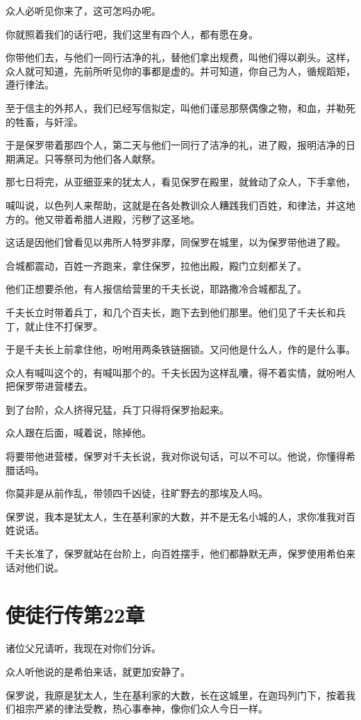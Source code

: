 \documentclass[12pt,oneside]{book}
\begin{document}
众人必听见你来了，这可怎吗办呢。

你就照着我们的话行吧，我们这里有四个人，都有愿在身。

你带他们去，与他们一同行洁净的礼，替他们拿出规费，叫他们得以剃头。这样，众人就可知道，先前所听见你的事都是虚的。并可知道，你自己为人，循规蹈矩，遵行律法。

至于信主的外邦人，我们已经写信拟定，叫他们谨忌那祭偶像之物，和血，并勒死的牲畜，与奸淫。

于是保罗带着那四个人，第二天与他们一同行了洁净的礼，进了殿，报明洁净的日期满足。只等祭司为他们各人献祭。

那七日将完，从亚细亚来的犹太人，看见保罗在殿里，就耸动了众人，下手拿他，

喊叫说，以色列人来帮助，这就是在各处教训众人糟践我们百姓，和律法，并这地方的。他又带着希腊人进殿，污秽了这圣地。

这话是因他们曾看见以弗所人特罗非摩，同保罗在城里，以为保罗带他进了殿。

合城都震动，百姓一齐跑来，拿住保罗，拉他出殿，殿门立刻都关了。

他们正想要杀他，有人报信给营里的千夫长说，耶路撒冷合城都乱了。

千夫长立时带着兵丁，和几个百夫长，跑下去到他们那里。他们见了千夫长和兵丁，就止住不打保罗。

于是千夫长上前拿住他，吩咐用两条铁链捆锁。又问他是什么人，作的是什么事。

众人有喊叫这个的，有喊叫那个的。千夫长因为这样乱囔，得不着实情，就吩咐人把保罗带进营楼去。

到了台阶，众人挤得兄猛，兵丁只得将保罗抬起来。

众人跟在后面，喊着说，除掉他。

将要带他进营楼，保罗对千夫长说，我对你说句话，可以不可以。他说，你懂得希腊话吗。

你莫非是从前作乱，带领四千凶徒，往旷野去的那埃及人吗。

保罗说，我本是犹太人，生在基利家的大数，并不是无名小城的人，求你准我对百姓说话。

千夫长准了，保罗就站在台阶上，向百姓摆手，他们都静默无声，保罗使用希伯来话对他们说。

\chapter{使徒行传第22章}
诸位父兄请听，我现在对你们分诉。

众人听他说的是希伯来话，就更加安静了。

保罗说，我原是犹太人，生在基利家的大数，长在这城里，在迦玛列门下，按着我们祖宗严紧的律法受教，热心事奉神，像你们众人今日一样。
\end{document}
